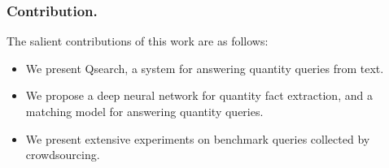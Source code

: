 \subsubsection{Contribution.}
The salient contributions of this work are as follows:
\begin{itemize}
\item We present Qsearch, a system for answering quantity queries from text.
\item We propose a deep neural network for quantity fact extraction, and a matching model for answering quantity queries.
\item  We present extensive experiments on benchmark queries collected by crowdsourcing.%

\end{itemize}
